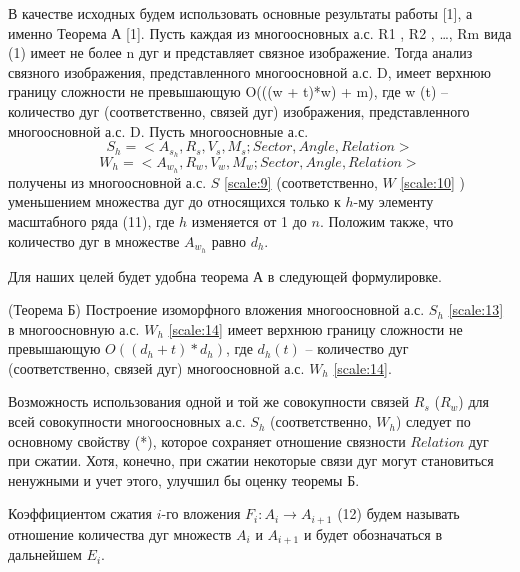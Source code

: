 В качестве исходных будем использовать основные результаты   работы  [1], а именно  
Теорема А [1].  Пусть каждая из многоосновных а.с. R1 , R2 , …, Rm  вида (1)  имеет не  более   n   дуг и представляет связное изображение. Тогда анализ  связного изображения, представленного  многоосновной а.с.  D,  имеет верхнюю границу сложности не превышающую O(((w + t)*w) + m),  где  w (t) – количество дуг (соответственно, связей дуг) изображения, представленного  многоосновной а.с. D.  
Пусть  многоосновные  а.с.  
\begin{equation}
S_h =< A_{s_h}, R_s, V_s, M_s; Sector, Angle, Relation>
\label{scale:13}
\end{equation}
\begin{equation}
W_h = < A_{w_h}, R_w, V_w, M_w; Sector,  Angle, Relation>
\label{scale:14}
\end{equation}
получены из многоосновной  а.с. $S$ \ref{scale:9} (соответственно,  $W$ \ref{scale:10} ) уменьшением множества дуг до  относящихся только к $h$-му элементу   масштабного ряда (11),  где  $h$  изменяется  от 1  до  $n$.  Положим также, что количество дуг в множестве  $A_{w_h}$ равно $d_h$.

\noindent
Для наших целей будет удобна  теорема  А в следующей формулировке.	
\begin{theorem}
(Теорема Б) Построение изоморфного  вложения  многоосновной  а.с. $S_h$ \ref{scale:13} в многоосновную  а.с. $W_h$  \ref{scale:14} имеет верхнюю границу сложности не превышающую $O((d_h + t)* d_h)$,  где  $d_h(t)$ – количество дуг (соответственно, связей дуг) многоосновной  а.с. $W_h$ \ref{scale:14}.
\label{scale:theoremB}
\end{theorem}

\begin{remark}
Возможность использования  одной и той же совокупности связей $R_s$ ($R_w$) для всей совокупности  многоосновных  а.с. $S_h$ (соответственно, $W_h$) следует по основному свойству (*),  которое сохраняет  отношение связности $Relation$ дуг при сжатии.  Хотя, конечно, при сжатии некоторые связи дуг могут становиться ненужными и учет этого, улучшил бы  оценку теоремы  Б.   
\end{remark}

\begin{definition}
Коэффициентом сжатия $i$-го  вложения $F_i : A_i \to A_{i+1}$ (12) будем называть отношение количества дуг множеств $A_i$ и $A_{i+1}$ и будет обозначаться в дальнейшем $E_i$.  
\end{definition}


